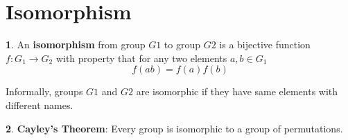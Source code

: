 \documentclass[a4paper,12pt]{article}
\theoremstyle{definition}
\newtheorem{definition}{}[section]
\theoremstyle{axiom}
\theoremstyle{theorem}
\begin{document}
\section{Isomorphism}
\begin{definition}{}
    An \textbf{isomorphism} from group $G1$ to group $G2$ is a bijective function $f: G_1 \to G_2$ with property that for any two elements $a, b \in G_1$
        \begin{equation}
                f(ab) = f(a)f(b)
        \end{equation}
\end{definition}
Informally, groups $G1$ and $G2$ are isomorphic if they have same elements with different names.
\begin{definition}{}
    \textbf{Cayley's Theorem}: Every group is isomorphic to a group of permutations.
\end{definition}
\end{document}

